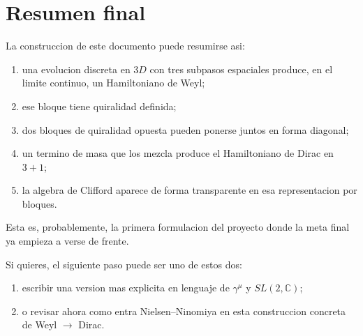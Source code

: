 \section{Resumen final}

La construccion de este documento puede resumirse asi:

\begin{enumerate}[leftmargin=*]
  \item una evolucion discreta en \(3D\) con tres subpasos espaciales produce, en el limite continuo, un Hamiltoniano de Weyl;
  \item ese bloque tiene quiralidad definida;
  \item dos bloques de quiralidad opuesta pueden ponerse juntos en forma diagonal;
  \item un termino de masa que los mezcla produce el Hamiltoniano de Dirac en \(3+1\);
  \item la algebra de Clifford aparece de forma transparente en esa representacion por bloques.
\end{enumerate}

Esta es, probablemente, la primera formulacion del proyecto donde la meta final ya empieza a verse de frente.

Si quieres, el siguiente paso puede ser uno de estos dos:

\begin{enumerate}[leftmargin=*]
  \item escribir una version mas explicita en lenguaje de \(\gamma^\mu\) y \(SL(2,\mathbb{C})\);
  \item o revisar ahora como entra Nielsen--Ninomiya en esta construccion concreta de Weyl \(\to\) Dirac.
\end{enumerate}
